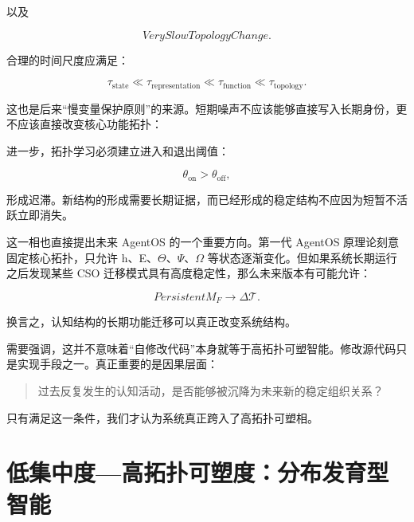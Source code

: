 以及

\begin{equation}
VerySlowTopologyChange.
\end{equation}

合理的时间尺度应满足：

\begin{equation}
\tau_{\mathrm{state}}
\ll
\tau_{\mathrm{representation}}
\ll
\tau_{\mathrm{function}}
\ll
\tau_{\mathrm{topology}}.
\end{equation}

这也是后来“慢变量保护原则”的来源。短期噪声不应该能够直接写入长期身份，更不应该直接改变核心功能拓扑：

\begin{statementbox}
\centering
{}
\end{statementbox}

进一步，拓扑学习必须建立进入和退出阈值：

\begin{equation}
\theta_{\mathrm{on}}
>
\theta_{\mathrm{off}},
\end{equation}

形成迟滞。新结构的形成需要长期证据，而已经形成的稳定结构不应因为短暂不活跃立即消失。

这一相也直接提出未来 AgentOS 的一个重要方向。第一代 AgentOS 原理论刻意固定核心拓扑，只允许 h、E、$\Theta$、$\Psi$、$\Omega$ 等状态逐渐变化。但如果系统长期运行之后发现某些 CSO 迁移模式具有高度稳定性，那么未来版本有可能允许：

\begin{equation}
PersistentM_F
\rightarrow
\Delta\mathcal{T}.
\end{equation}

换言之，认知结构的长期功能迁移可以真正改变系统结构。

需要强调，这并不意味着“自修改代码”本身就等于高拓扑可塑智能。修改源代码只是实现手段之一。真正重要的是因果层面：

\begin{quote}
过去反复发生的认知活动，是否能够被沉降为未来新的稳定组织关系？
\end{quote}

只有满足这一条件，我们才认为系统真正跨入了高拓扑可塑相。

\section{低集中度—高拓扑可塑度：分布发育型智能}
\label{sec:distributed_plastic_phase}

